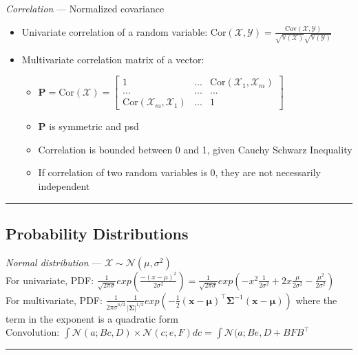 \emph{Correlation} --- Normalized covariance
\begin{itemize}
    \item Univariate correlation of a random variable: $\textrm{Cor}(\mathcal{X}, \mathcal{Y}) = \frac{\textrm{Cov}(\mathcal{X}, \mathcal{Y})}{\sqrt{\mathbb{V}(\mathcal{X})} \sqrt{\mathbb{V}(\mathcal{Y})}}$ 
    \item Multivariate correlation matrix of a vector: 
    \begin{itemize}
        \item $\boldsymbol{P} = \textrm{Cor}(\boldsymbol{\mathcal{X}}) = \begin{bmatrix}
        1 & ... & \textrm{Cor}(\mathcal{X}_1,\mathcal{X}_m) \\
        ... & ... & ... \\
        \textrm{Cor}(\mathcal{X}_m,\mathcal{X}_1) & ... & 1
        \end{bmatrix}$
        \item $\boldsymbol{P}$ is symmetric and psd
        \item Correlation is bounded between 0 and 1, given Cauchy Schwarz Inequality
        \item If correlation of two random variables is 0, they are not necessarily independent
    \end{itemize}
\end{itemize}

{\color{black}\hrule height 0.001mm}

\subsection*{Probability Distributions}
\emph{Normal distribution} --- 
$\mathcal{X} \sim \mathcal{N}(\mu, \sigma^2)$\\
For univariate, PDF: $\frac{1}{\sqrt{2\pi\sigma}} exp(\frac{-(x-\mu)^2}{2\sigma^2}) = \frac{1}{\sqrt{2\pi\sigma}} exp(-x^2 \frac{1}{2\sigma^2} +2x \frac{\mu}{2\sigma^2} - \frac{\mu^2}{2\sigma^2})$\\
For multivariate, PDF: $\frac{1}{{2\pi\sigma}^{n/2}} \frac{1}{|\boldsymbol{\Sigma}|^{1/2}} exp(-\frac{1}{2} (\boldsymbol{x}-\boldsymbol{\mu})^\intercal \boldsymbol{\Sigma}^{-1} (\boldsymbol{x}-\boldsymbol{\mu}))$ where the term in the exponent is a quadratic form\\
Convolution: $\int \mathcal{N}(a;Bc,D) \times \mathcal{N}(c;e,F) dc = \int \mathcal{N}(a;Be,D + BFB^\intercal$

{\color{lightgray}\hrule height 0.001mm}

